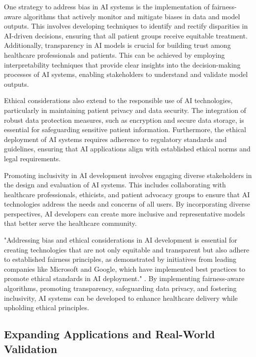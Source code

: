 One strategy to address bias in AI systems is the implementation of fairness-aware algorithms that actively monitor and mitigate biases in data and model outputs. This involves developing techniques to identify and rectify disparities in AI-driven decisions, ensuring that all patient groups receive equitable treatment. Additionally, transparency in AI models is crucial for building trust among healthcare professionals and patients. This can be achieved by employing interpretability techniques that provide clear insights into the decision-making processes of AI systems, enabling stakeholders to understand and validate model outputs.



Ethical considerations also extend to the responsible use of AI technologies, particularly in maintaining patient privacy and data security. The integration of robust data protection measures, such as encryption and secure data storage, is essential for safeguarding sensitive patient information. Furthermore, the ethical deployment of AI systems requires adherence to regulatory standards and guidelines, ensuring that AI applications align with established ethical norms and legal requirements.



Promoting inclusivity in AI development involves engaging diverse stakeholders in the design and evaluation of AI systems. This includes collaborating with healthcare professionals, ethicists, and patient advocacy groups to ensure that AI technologies address the needs and concerns of all users. By incorporating diverse perspectives, AI developers can create more inclusive and representative models that better serve the healthcare community.



"Addressing bias and ethical considerations in AI development is essential for creating technologies that are not only equitable and transparent but also adhere to established fairness principles, as demonstrated by initiatives from leading companies like Microsoft and Google, which have implemented best practices to promote ethical standards in AI deployment." \cite{magee2021intersectionalbiascausallanguage}. By implementing fairness-aware algorithms, promoting transparency, safeguarding data privacy, and fostering inclusivity, AI systems can be developed to enhance healthcare delivery while upholding ethical principles.



\subsection{Expanding Applications and Real-World Validation} \label{subsec:Expanding Applications and Real-World Validation}



